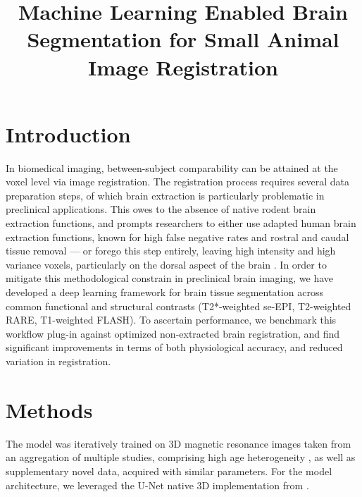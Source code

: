 \documentclass[11pt, english]{article}
\title{Machine Learning Enabled Brain Segmentation for Small Animal Image Registration}
\date{}
\begin{document}
    \maketitle


    \section{Introduction}
    In biomedical imaging, between-subject comparability can be attained at the voxel level via image registration.
    The registration process requires several data preparation steps, of which brain extraction is particularly problematic in preclinical applications.
    This owes to the absence of native rodent brain extraction functions, and prompts researchers to either use adapted human brain extraction functions, known for high false negative rates and rostral and caudal tissue removal --- or forego this step entirely, leaving high intensity and high variance voxels, particularly on the dorsal aspect of the brain \cite{ioanas_optimized_2019}.
    In order to mitigate this methodological constrain in preclinical brain imaging, we have developed a deep learning framework for brain tissue segmentation across common functional and structural contrasts (T2*-weighted se-EPI, T2-weighted RARE, T1-weighted FLASH).
    To ascertain performance, we benchmark this workflow plug-in against optimized non-extracted brain registration, and find significant improvements in terms of both physiological accuracy, and reduced variation in registration.

    \section{Methods}
    The model was iteratively trained on 3D magnetic resonance images taken from an aggregation of multiple studies, comprising high age heterogeneity \citet{ioanas_whole-brain_nodate,imperfect_datasets}, as well as supplementary novel data, acquired with similar parameters.
    For the model architecture, we leveraged the U-Net \citep{ronneberger_u-net:_2015} native 3D implementation from \citet{oktay_ozan-oktayattention-gated-networks_2020}.
\end{document}
